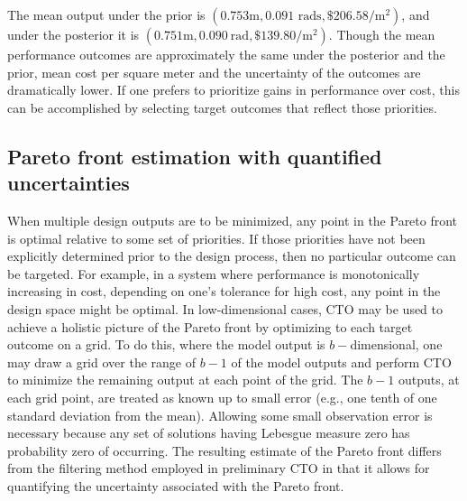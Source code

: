 \documentclass[twocolumn,10pt]{asme2ej}
\begin{document}
The mean output under the prior is $(0.753\mathrm m,0.091\text{ rads},\$206.58/\mathrm m^2)$, and under the posterior it is $(0.751\mathrm m,0.090\ \mathrm{rad},\$139.80/\mathrm m^2)$.
%
Though the mean performance outcomes are approximately the same under the posterior and the prior, mean cost per square meter and the uncertainty of the outcomes are dramatically lower.
%
If one prefers to prioritize gains in performance over cost, this can be accomplished by selecting target outcomes that reflect those priorities.
%

%
\subsection{Pareto front estimation with quantified uncertainties}\label{removing_cal_pars}


%
When multiple design outputs are to be minimized, any point in the Pareto front is optimal relative to some set of priorities.
%
If those priorities have not been explicitly determined prior to the design process, then no particular outcome can be targeted.
%
%
For example, in a system where performance is monotonically increasing in cost, depending on one's tolerance for high cost, any point in the design space might be optimal.
%
%
In low-dimensional cases, CTO may be used to achieve a holistic picture of the Pareto front by optimizing to each target outcome on a grid.
%
To do this, where the model output is $b-$dimensional, one may draw a grid over the range of $b-1$ of the model outputs and perform CTO to minimize the remaining output at each point of the grid.
%
The $b-1$ outputs, at each grid point, are treated as known up to small error (e.g., one tenth of one standard deviation from the mean).
%
Allowing some small observation error is necessary because any set of solutions having Lebesgue measure zero has probability zero of occurring.
%
The resulting estimate of the Pareto front differs from the filtering method employed in preliminary CTO in that it allows for quantifying the uncertainty associated with the Pareto front.
%
\end{document}
